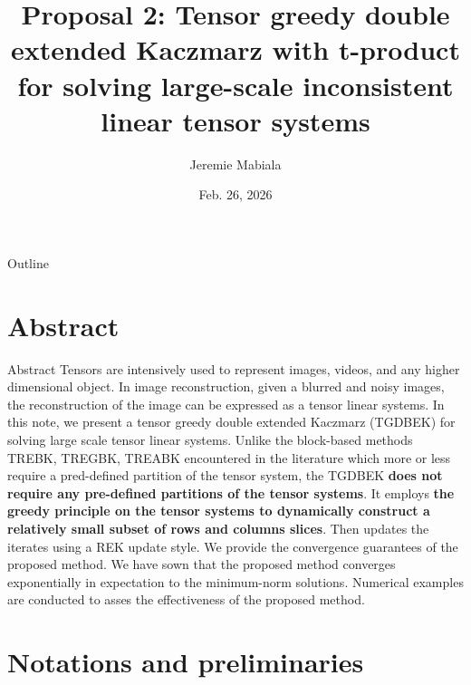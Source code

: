 \documentclass[aspectratio=169]{beamer}
\title[TGDBEK]{Proposal 2: Tensor greedy double extended Kaczmarz with t-product for solving large-scale inconsistent linear tensor systems}
\author[Jeremie Mabiala]{Jeremie Mabiala}
\institute[AIMS Senegal]{%
AIMS Senegal
}
\date{Feb. 26, 2026} %
\begin{document}

\begin{frame}
  \titlepage
\end{frame}

\begin{frame}{Outline}
  \tableofcontents
\end{frame}

\section{Abstract}
\begin{frame}{Abstract}
Tensors are intensively used to represent images, videos, and any higher dimensional object. In image reconstruction, given a blurred and noisy images, the reconstruction of the image can be expressed as a tensor linear systems. In this note, we present a tensor greedy double extended Kaczmarz (TGDBEK) for solving large scale tensor linear systems. Unlike the block-based methods TREBK, TREGBK, TREABK encountered in the literature which more or less require a pred-defined partition of the tensor system, the TGDBEK \textbf{does not require any pre-defined partitions of the tensor systems}. It employs \textbf{the greedy principle on the tensor systems to dynamically construct a relatively small subset of rows and columns slices}. Then updates the iterates  using  a REK update style.  We provide the convergence guarantees of the proposed method. We have sown that the proposed method converges exponentially in expectation to the minimum-norm solutions. Numerical examples are conducted to asses the effectiveness of the proposed method.
\end{frame}

\section{Notations and preliminaries } 
\end{document}
